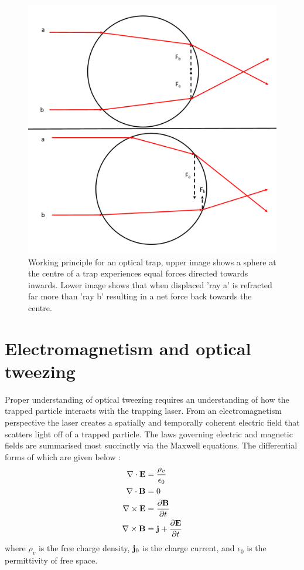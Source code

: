\begin{figure}[h!]
  \centering
  \includegraphics[width=0.65\linewidth]{ot_working_principal.png}
  \caption{Working principle for an optical trap, upper image shows a sphere at the centre of a trap experiences equal forces directed towards inwards. Lower image shows that when displaced 'ray a' is refracted far more than 'ray b' resulting in a net force back towards the centre.}
  \label{fig:working_principle}
\end{figure}

\section{Electromagnetism and optical tweezing}

Proper understanding of optical tweezing requires an understanding of
how the trapped particle interacts with the trapping laser. From an 
electromagnetism perspective the laser creates a spatially and 
temporally coherent electric field that scatters light off of a 
trapped particle.  The laws governing electric and magnetic fields 
are summarised most succinctly via the Maxwell equations. The 
differential forms of which are given below \cite{Jackson_1975}:
\begin{align}
  \nabla \cdot \mathbf{E}
  &= \frac{\rho_ v}{\epsilon_0}
  \\
  \nabla \cdot \mathbf{B}
  &= 0
  \\
  \nabla \times \mathbf{E}
  &= \frac{\partial \mathbf{B}}{\partial t}
  \\
  \nabla \times \mathbf{B}
  &= {\bf j} +\frac{\partial \mathbf{E}}{\partial t}    
\end{align}
where $\rho_v$ is the free charge density, ${\bf j}_0$ is the charge
current, and $\epsilon_0$ is the permittivity of free space. 


